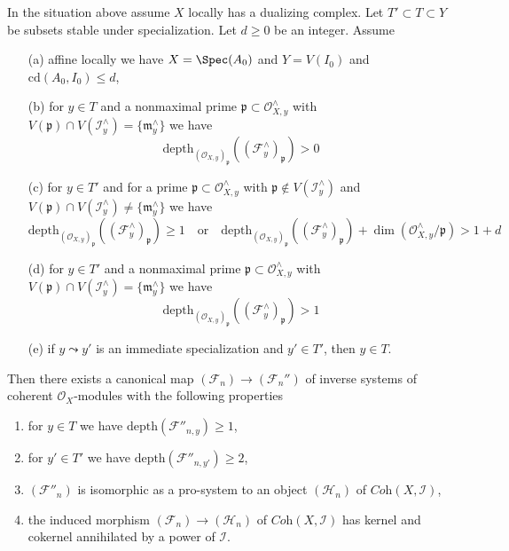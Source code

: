 \begin{lemma}
\label{lemma-improvement-formal-coherent-module-better}
In the situation above assume $X$ locally has a dualizing complex.
Let $T' \subset T \subset Y$ be subsets stable under specialization.
Let $d \geq 0$ be an integer. Assume
\begin{enumerate}
\item[(a)] affine locally we have $X = \Spec(A_0)$ and $Y = V(I_0)$
and $\text{cd}(A_0, I_0) \leq d$,
\item[(b)] for $y \in T$ and a nonmaximal prime
$\mathfrak p \subset \mathcal{O}_{X, y}^\wedge$ with
$V(\mathfrak p) \cap V(\mathcal{I}_y^\wedge) = \{\mathfrak m_y^\wedge\}$
we have
$$
\text{depth}_{(\mathcal{O}_{X, y})_\mathfrak p}
((\mathcal{F}^\wedge_y)_\mathfrak p) > 0
$$
\item[(c)] for $y \in T'$ and for a prime
$\mathfrak p \subset \mathcal{O}_{X, y}^\wedge$ with
$\mathfrak p \not \in V(\mathcal{I}_y^\wedge)$
and $V(\mathfrak p) \cap V(\mathcal{I}_y^\wedge) \not =
\{\mathfrak m_y^\wedge\}$ we have
$$
\text{depth}_{(\mathcal{O}_{X, y})_\mathfrak p}
((\mathcal{F}^\wedge_y)_\mathfrak p) \geq 1
\quad\text{or}\quad
\text{depth}_{(\mathcal{O}_{X, y})_\mathfrak p}
((\mathcal{F}^\wedge_y)_\mathfrak p) +
\dim(\mathcal{O}_{X, y}^\wedge/\mathfrak p) > 1 + d
$$
\item[(d)] for $y \in T'$ and a nonmaximal prime
$\mathfrak p \subset \mathcal{O}_{X, y}^\wedge$ with
$V(\mathfrak p) \cap V(\mathcal{I}_y^\wedge) = \{\mathfrak m_y^\wedge\}$
we have
$$
\text{depth}_{(\mathcal{O}_{X, y})_\mathfrak p}
((\mathcal{F}^\wedge_y)_\mathfrak p) > 1
$$
\item[(e)] if $y \leadsto y'$ is an immediate specialization and
$y' \in T'$, then $y \in T$.
\end{enumerate}
Then there exists a canonical map $(\mathcal{F}_n) \to (\mathcal{F}_n'')$
of inverse systems of coherent $\mathcal{O}_X$-modules
with the following properties
\begin{enumerate}
\item for $y \in T$ we have $\text{depth}(\mathcal{F}''_{n, y}) \geq 1$,
\item for $y' \in T'$ we have $\text{depth}(\mathcal{F}''_{n, y'}) \geq 2$,
\item $(\mathcal{F}''_n)$ is isomorphic as a pro-system to an object
$(\mathcal{H}_n)$ of $\textit{Coh}(X, \mathcal{I})$,
\item the induced morphism $(\mathcal{F}_n) \to (\mathcal{H}_n)$ of
$\textit{Coh}(X, \mathcal{I})$ has kernel and cokernel
annihilated by a power of $\mathcal{I}$.
\end{enumerate}
\end{lemma}

